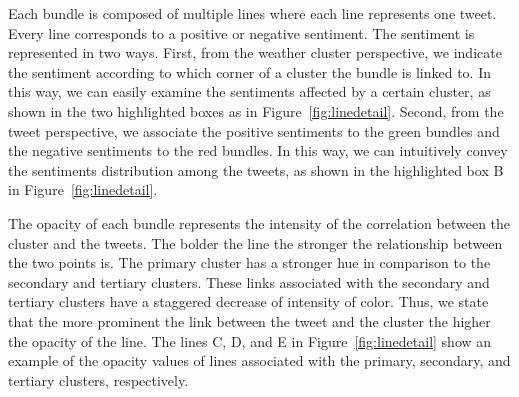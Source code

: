 Each bundle is composed of multiple lines where each line represents one tweet. Every line corresponds to a positive or negative sentiment. The sentiment is represented in two ways. First, from the weather cluster perspective, we indicate the sentiment according to which corner of a cluster the bundle is linked to. In this way, we can easily examine the sentiments affected by a certain cluster, as shown in the two highlighted boxes as in Figure~\ref{fig:linedetail}. Second, from the tweet perspective, we associate the positive sentiments to the green bundles and the negative sentiments to the red bundles. In this way, we can intuitively convey the sentiments distribution among the tweets, as shown in the highlighted box B in Figure~\ref{fig:linedetail}.

The opacity of each bundle represents the intensity of the correlation between the cluster and the tweets. The bolder the line the stronger the relationship between the two points is. The primary cluster has a stronger hue in comparison to the secondary and tertiary clusters. These links associated with the secondary and tertiary clusters have a staggered decrease of intensity of color. Thus, we state that the more prominent the link between the tweet and the cluster the higher the opacity of the line. The lines C, D, and E in Figure~\ref{fig:linedetail} show an example of the opacity values of lines associated with the primary, secondary, and tertiary clusters, respectively.


